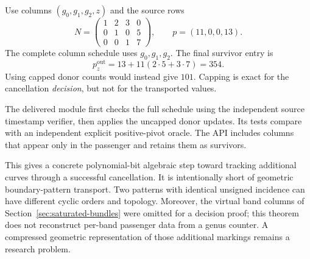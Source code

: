 \begin{example}
Use columns $(g_0,g_1,g_2,z)$ and the source rows
\[
 N=\begin{pmatrix}
 1&2&3&0\\
 0&1&0&5\\
 0&0&1&7
 \end{pmatrix},\qquad
 p=(11,0,0,13).
\]
The complete column schedule uses $g_0,g_1,g_2$. The final survivor entry is
\[
 p_z^{\mathrm{out}}=13+11(2\cdot5+3\cdot7)=354.
\]
Using capped donor counts would instead give $101$. Capping is exact for
the cancellation \emph{decision}, but not for the transported values.
\end{example}

The delivered  module first checks the full
schedule using the independent source timestamp verifier, then applies
the uncapped donor updates. Its tests compare with an independent explicit
positive-pivot oracle. The API includes columns that appear only in the
passenger and retains them as survivors.

This gives a concrete polynomial-bit algebraic step toward tracking
additional curves through a successful cancellation. It is intentionally
short of geometric boundary-pattern transport. Two patterns with identical
unsigned incidence can have different cyclic orders and topology.
Moreover, the virtual band columns of Section~\ref{sec:saturated-bundles}
were omitted for a decision proof; this theorem does not reconstruct
per-band passenger data from a genus counter. A compressed geometric
representation of those additional markings remains a research problem.
